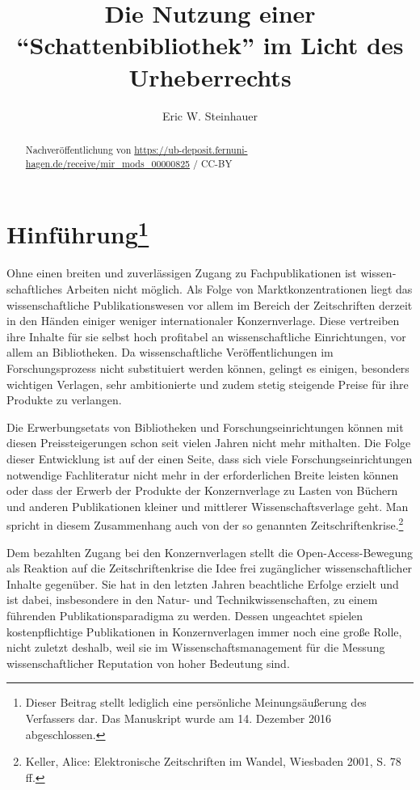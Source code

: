 \documentclass[a4paper,
fontsize=11pt,
oneside,
numbers=noperiodatend,
parskip=half-,
bibliography=totoc,
final
]{scrartcl}
\title{\LARGE{Die Nutzung einer \enquote{Schattenbibliothek} im Licht des Urheberrechts}} %
\author{Eric W. Steinhauer} %
\date{}
\begin{document}
\maketitle
\thispagestyle{fancyplain} 

\begin{abstract}
Nachveröffentlichung von
\url{https://ub-deposit.fernuni-hagen.de/receive/mir_mods_00000825} /
CC-BY
\end{abstract}

\section{Hinführung\protect\footnote{Dieser
  Beitrag stellt lediglich eine persönliche Meinungsäußerung des
  Verfassers dar. Das Manuskript wurde am 14. Dezember 2016
  abgeschlossen.}}

Ohne einen breiten und zuverlässigen Zugang zu Fachpublikationen ist
wissen­schaftliches Arbeiten nicht möglich. Als Folge von
Marktkonzentrationen liegt das wissenschaftliche Publikationswesen vor
allem im Bereich der Zeitschriften derzeit in den Händen einiger weniger
internationaler Konzernverlage. Diese vertreiben ihre Inhalte für sie
selbst hoch profitabel an wissenschaftliche Einrichtungen, vor allem an
Bibliotheken. Da wissenschaftliche Veröffentlichungen im
Forschungsprozess nicht substituiert werden können, gelingt es einigen,
besonders wichtigen Verlagen, sehr ambitionierte und zudem stetig
steigende Preise für ihre Produkte zu verlangen.

Die Erwerbungsetats von Bibliotheken und Forschungseinrichtungen können
mit diesen Preissteigerungen schon seit vielen Jahren nicht mehr
mithalten. Die Folge dieser Entwicklung ist auf der einen Seite, dass
sich viele Forschungseinrichtungen notwendige Fachliteratur nicht mehr
in der erforderlichen Breite leisten können oder dass der Erwerb der
Produkte der Konzernverlage zu Lasten von Büchern und anderen
Publikationen kleiner und mittlerer Wissenschaftsverlage geht. Man
spricht in diesem Zusammenhang auch von der so genannten
Zeitschriftenkrise.\footnote{Keller, Alice: Elektronische Zeitschriften
  im Wandel, Wiesbaden 2001, S. 78 ff.}

Dem bezahlten Zugang bei den Konzernverlagen stellt die
Open-Access-Bewegung als Reaktion auf die Zeitschriftenkrise die Idee
frei zugänglicher wissenschaftlicher Inhalte gegenüber. Sie hat in den
letzten Jahren beachtliche Erfolge erzielt und ist dabei, insbesondere
in den Natur- und Technikwissenschaften, zu einem führenden
Publikationsparadigma zu werden. Dessen ungeachtet spielen
kostenpflichtige Publikationen in Konzernverlagen immer noch eine große
Rolle, nicht zuletzt deshalb, weil sie im Wissenschaftsmanagement für
die Messung wissenschaftlicher Reputation von hoher Bedeutung sind.
\end{document}
